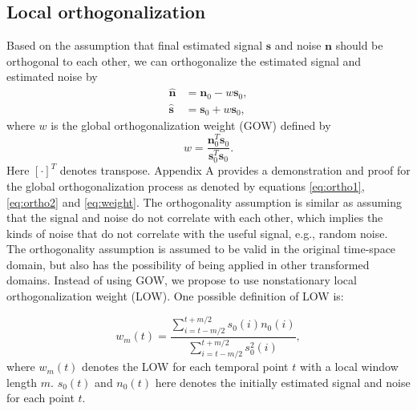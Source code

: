 \subsection{Local orthogonalization}
Based on the assumption that final estimated signal $\mathbf{s}$ and noise $\mathbf{n}$ should be orthogonal to each other, we can orthogonalize the estimated signal and estimated noise by
\begin{align}
\label{eq:ortho1}
\hat{\mathbf{n}} &= \mathbf{n}_0 - w\mathbf{s}_0, \\
\label{eq:ortho2}
\hat{\mathbf{s}} &= \mathbf{s}_0 + w\mathbf{s}_0,
\end{align}
where $w$ is the global orthogonalization weight (GOW) defined by
\begin{equation}
\label{eq:weight}
w=\frac{\mathbf{n}_0^T\mathbf{s}_0}{\mathbf{s}_0^T\mathbf{s}_0}.
\end{equation} 
Here $[\cdot]^T$ denotes transpose.
Appendix A provides a demonstration and proof for the global orthogonalization process as denoted by equations \ref{eq:ortho1}, \ref{eq:ortho2} and \ref{eq:weight}. The orthogonality assumption is similar as assuming that the signal and noise do not correlate with each other, which implies the kinds of noise that do not correlate with the useful signal, e.g., random noise. The orthogonality assumption is assumed to be valid in the original time-space domain, but also has the possibility of being applied in other transformed domains.
Instead of using GOW, we propose to use nonstationary local orthogonalization weight (LOW). One possible definition of LOW is:

      \begin{equation}
          w_m(t) = \frac{\displaystyle\sum_{i=t-m/2}^{t+m/2} s_0(i) n_0(i)}{\displaystyle\sum_{i=t-m/2}^{t+m/2} s_0^2(i)},
        \label{eq:eq2}
      \end{equation}
where $w_m(t)$ denotes the LOW for each temporal point $t$ with a local window length $m$. $s_0(t)$ and $n_0(t)$ here denotes the initially estimated signal and noise for each point $t$.



